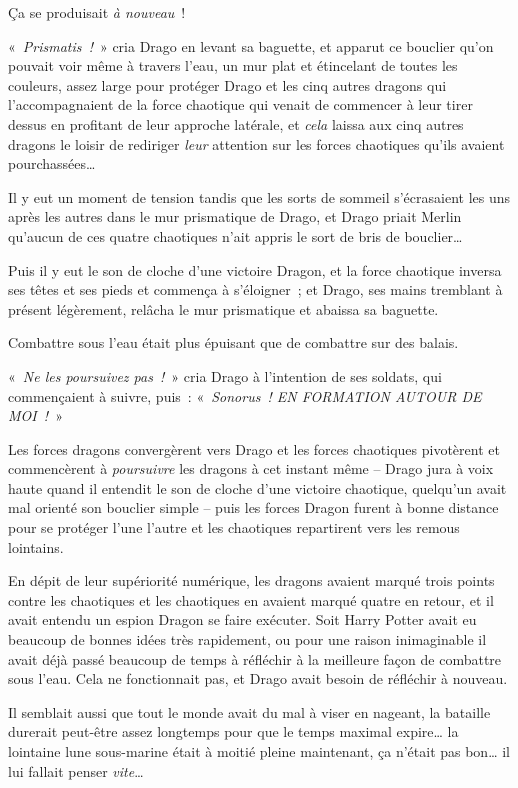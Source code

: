 Ça se produisait \emph{à nouveau}~!

«~\emph{Prismatis~!}~» cria Drago en levant sa baguette, et apparut ce bouclier qu'on pouvait voir même à travers l'eau, un mur plat et étincelant de toutes les couleurs, assez large pour protéger Drago et les cinq autres dragons qui l'accompagnaient de la force chaotique qui venait de commencer à leur tirer dessus en profitant de leur approche latérale, et \emph{cela} laissa aux cinq autres dragons le loisir de rediriger \emph{leur} attention sur les forces chaotiques qu'ils avaient pourchassées…

Il y eut un moment de tension tandis que les sorts de sommeil s'écrasaient les uns après les autres dans le mur prismatique de Drago, et Drago priait Merlin qu'aucun de ces quatre chaotiques n'ait appris le sort de bris de bouclier…

Puis il y eut le son de cloche d'une victoire Dragon, et la force chaotique inversa ses têtes et ses pieds et commença à s'éloigner~; et Drago, ses mains tremblant à présent légèrement, relâcha le mur prismatique et abaissa sa baguette.

Combattre sous l'eau était plus épuisant que de combattre sur des balais.

«~\emph{Ne les poursuivez pas~!}~» cria Drago à l'intention de ses soldats, qui commençaient à suivre, puis~: «~\emph{Sonorus~! EN FORMATION AUTOUR DE MOI~!}~»

Les forces dragons convergèrent vers Drago et les forces chaotiques pivotèrent et commencèrent à \emph{poursuivre} les dragons à cet instant même -- Drago jura à voix haute quand il entendit le son de cloche d'une victoire chaotique, quelqu'un avait mal orienté son bouclier simple -- puis les forces Dragon furent à bonne distance pour se protéger l'une l'autre et les chaotiques repartirent vers les remous lointains.

En dépit de leur supériorité numérique, les dragons avaient marqué trois points contre les chaotiques et les chaotiques en avaient marqué quatre en retour, et il avait entendu un espion Dragon se faire exécuter. Soit Harry Potter avait eu beaucoup de bonnes idées très rapidement, ou pour une raison inimaginable il avait déjà passé beaucoup de temps à réfléchir à la meilleure façon de combattre sous l'eau. Cela ne fonctionnait pas, et Drago avait besoin de réfléchir à nouveau.

Il semblait aussi que tout le monde avait du mal à viser en nageant, la bataille durerait peut-être assez longtemps pour que le temps maximal expire… la lointaine lune sous-marine était à moitié pleine maintenant, ça n'était pas bon… il lui fallait penser \emph{vite}…

